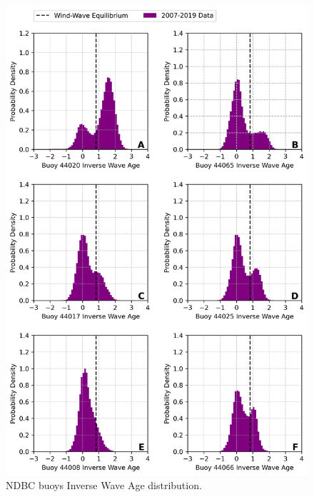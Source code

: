 \begin{figure}[H]
\centering
\includegraphics[width=0.95\linewidth]{Figures/Chapter5/inv_wave_age_pdfs.png}
\caption{NDBC buoys Inverse Wave Age distribution.}
\label{fig:inv_wave_age_buoys}
\end{figure}


